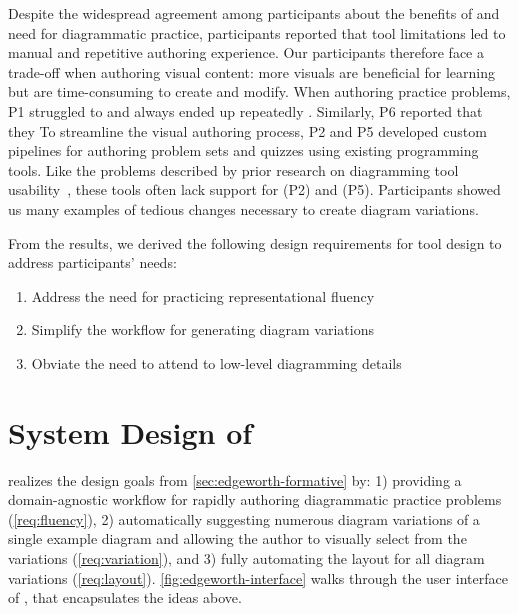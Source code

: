 Despite the widespread agreement among participants about the benefits of and need for diagrammatic practice, participants reported that tool limitations led to manual and repetitive authoring experience. Our participants therefore face a trade-off when authoring visual content: more visuals are beneficial for learning but are time-consuming to create and modify. When authoring practice problems, P1 struggled to  and always ended up repeatedly . Similarly, P6 reported that they  To streamline the visual authoring process, P2 and P5 developed custom pipelines for authoring problem sets and quizzes using existing programming tools. Like the problems described by prior research on diagramming tool usability~\cite{naturalDiagramming}, these tools often lack support for  (P2) and  (P5). Participants showed us many examples of tedious changes necessary to create diagram variations.

From the results, we derived the following design requirements for tool design to address participants' needs:

\begin{enumerate}[label=\textbf{D\arabic*}]
    \item\label{req:fluency} Address the need for practicing representational fluency
    \item\label{req:variation} Simplify the workflow for generating diagram variations
    \item\label{req:layout} Obviate the need to attend to low-level diagramming details
\end{enumerate}



\section{System Design of \Edgeworth}
\label{sec:edgeworth-system-design}


\Edgeworth realizes the design goals from \cref{sec:edgeworth-formative} by: 1) providing a domain-agnostic workflow for rapidly authoring diagrammatic practice problems (\ref{req:fluency}), 2) automatically suggesting numerous diagram variations of a single example diagram and allowing the author to visually select from the variations (\ref{req:variation}), and 3) fully automating the layout for all diagram variations (\ref{req:layout}). \cref{fig:edgeworth-interface} walks through the user interface of \Edgeworth, that encapsulates the ideas above.

